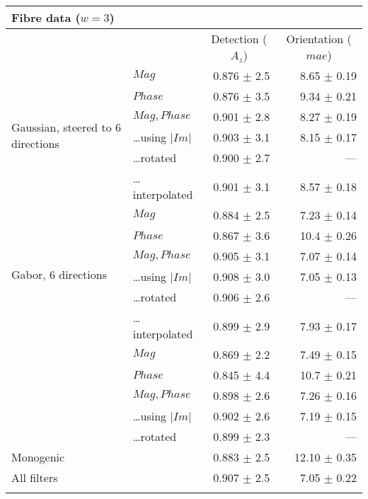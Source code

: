 
\begin{tabularx}{\columnwidth}{X X r r}
\toprule
\multicolumn{4}{p{\columnwidth}}{ Fibre data ($w = 3$)} \\
\midrule
        &                               & \multicolumn{1}{c}{Detection  \linebreak ($A_z$)}
                                        & \multicolumn{1}{c}{Orientation  \linebreak ($mae$)} \\
\midrule
\multirow{6}{2cm}{Gaussian, steered to 6 directions}
        & $Mag$                         & 0.876 $\pm$ 2.5   & 8.65 $\pm$ 0.19 \\
        & $Phase$                       & 0.876 $\pm$ 3.5   & 9.34 $\pm$ 0.21 \\
        & $Mag, Phase$                  & 0.901 $\pm$ 2.8   & 8.27 $\pm$ 0.19 \\
        & \ldots using $|Im|$           & 0.903 $\pm$ 3.1   & 8.15 $\pm$ 0.17 \\
        & \ldots rotated                & 0.900 $\pm$ 2.7   & --- \\
        & \ldots interpolated           & 0.901 $\pm$ 3.1   & 8.57 $\pm$ 0.18 \\
\midrule
\multirow{6}{2cm}{Gabor, 6 directions}
        & $Mag$                         & 0.884 $\pm$ 2.5   & 7.23 $\pm$ 0.14 \\
        & $Phase$                       & 0.867 $\pm$ 3.6   &10.4 $\pm$ 0.26 \\
        & $Mag,Phase$                   & 0.905 $\pm$ 3.1   & 7.07 $\pm$ 0.14 \\
        & \ldots using $|Im|$           & 0.908 $\pm$ 3.0   & 7.05 $\pm$ 0.13 \\
        & \ldots rotated                & 0.906 $\pm$ 2.6   & --- \\
        & \ldots interpolated           & 0.899 $\pm$ 2.9   & 7.93 $\pm$ 0.17 \\
\midrule
\multirow{5}{2cm}{\dtcwt{}}
        & $Mag$                         & 0.869 $\pm$ 2.2   & 7.49 $\pm$ 0.15 \\
        & $Phase$                       & 0.845 $\pm$ 4.4   & 10.7 $\pm$ 0.21 \\
        & $Mag,Phase$                   & 0.898 $\pm$ 2.6   & 7.26 $\pm$ 0.16 \\
        & \ldots using $|Im|$           & 0.902 $\pm$ 2.6   & 7.19 $\pm$ 0.15 \\
        & \ldots rotated                & 0.899 $\pm$ 2.3   & --- \\
\midrule
\multicolumn{2}{l}{Monogenic}           & 0.883 $\pm$ 2.5   &12.10 $\pm$ 0.35 \\
\midrule
\multicolumn{2}{l}{All filters}         & 0.907 $\pm$ 2.5   & 7.05 $\pm$ 0.22 \\

\bottomrule
\noalign{\smallskip}
\end{tabularx}
